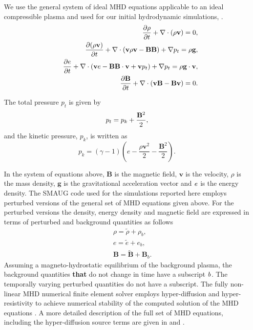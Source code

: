 \documentclass[physics,article,submit,pdftex,moreauthors]{Definitions/mdpi}
\begin{document}
We use the 
general system of ideal MHD equations applicable to an ideal compressible plasma and used for our initial hydrodynamic simulations, \cite{Griffiths2018b}.
\begin{eqnarray}
&& {{\partial \rho}\over{\partial t}}+\nabla\cdot\left( \rho{\mathbf v}\right)=0, \label{e1} \\
&& {{\partial ( \rho {\bf v})}\over{\partial t}}+\nabla\cdot\left( {\bf v}\rho {\bf v}-{\bf B B}\right)+\nabla p_t=\rho{\bf g}, \label{e2}\\
&& \frac{\partial e}{\partial t}+\nabla\cdot\left({\bf v}e-{\bf B B}\cdot{\bf v}+{\bf v}p_{t}\right)+\nabla p_t=\rho{\bf g}\cdot{\bf v}, \label{e3} \\
&& {{\partial{\bf B}}\over{\partial t}} +\nabla \cdot\left(  {\bf vB}-{\bf Bv}\right)=0. \label{e4}
\end{eqnarray}

\noindent
The total pressure $p_{t}$ is given by
\begin{equation}
p_{t}=p_{k}+{{\bf B}^{2}\over{2}}, \label{e5}
\end{equation}
and the kinetic pressure, $p_k$, is written as
\begin{equation}
p_{k}=\left(\gamma -1\right)\left(e-\frac{\rho {\mathbf v}^{2}}{2}-\frac{{\mathbf B}^{2}}{2}\right). \label{e6}
\end{equation}

In the system of equations above,  $\mathbf B$ is the magnetic field, $\mathbf v$ is the velocity, $\rho$ is the mass density, $\mathbf g$ is the gravitational acceleration vector  and  $\it{e}$ is the energy density. The SMAUG code used for the simulations reported here employs perturbed versions of the general set of MHD equations given above. For the perturbed versions the density,  energy density and magnetic field are expressed in terms of perturbed and background quantities as follows
\begin{eqnarray}
&& \rho = \tilde{\rho}+\rho_b, \nonumber \\
&& e = \tilde{e}+e_b,  \nonumber \\
&& {\mathbf B} = \tilde{\mathbf B}+{\mathbf B}_b.  \nonumber 
\end{eqnarray}
Assuming a magneto-hydrostatic equilibrium of the background plasma, the background quantities {\bf that} do not change in time have a subscript $\it{b}$. The temporally varying perturbed quantities do not have a subscript. The fully non-linear MHD numerical finite element solver employs hyper-diffusion and hyper-resistivity to achieve numerical stability of the computed solution of the MHD equations \cite{Caunt2001}. A more detailed description of the full set of MHD equations, including the hyper-diffusion source terms are given in \cite{Griffiths2015} and \cite{Shelyag2008}.
\end{document}
